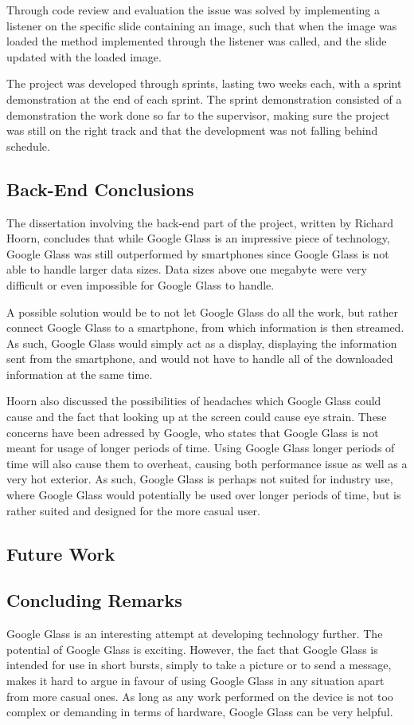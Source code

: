 Through code review and evaluation the issue was solved by implementing a listener on the specific slide containing an image, such that when the image was loaded the method implemented through the listener was called, and the slide updated with the loaded image.

The project was developed through sprints, lasting two weeks each, with a sprint demonstration at the end of each sprint. The sprint demonstration consisted of a demonstration the work done so far to the supervisor, making sure the project was still on the right track and that the development was not falling behind schedule.

\subsection{Back-End Conclusions}
The dissertation involving the back-end part of the project, written by Richard Hoorn, concludes that while Google Glass is an impressive piece of technology, Google Glass was still outperformed by smartphones since Google Glass is not able to handle larger data sizes. Data sizes above one megabyte were very difficult or even impossible for Google Glass to handle.

A possible solution would be to not let Google Glass do all the work, but rather connect Google Glass to a smartphone, from which information is then streamed. As such, Google Glass would simply act as a display, displaying the information sent from the smartphone, and would not have to handle all of the downloaded information at the same time.

Hoorn also discussed the possibilities of headaches which Google Glass could cause and the fact that looking up at the screen could cause eye strain. These concerns have been adressed by Google, who states that Google Glass is not meant for usage of longer periods of time. Using Google Glass longer periods of time will also cause them to overheat, causing both performance issue as well as a very hot exterior. As such, Google Glass is perhaps not suited for industry use, where Google Glass would potentially be used over longer periods of time, but is rather suited and designed for the more casual user.

\subsection{Future Work}
\label{subsec:futurework}


\subsection{Concluding Remarks}
Google Glass is an interesting attempt at developing technology further. The potential of Google Glass is exciting. However, the fact that Google Glass is intended for use in short bursts, simply to take a picture or to send a message, makes it hard to argue in favour of using Google Glass in any situation apart from more casual ones. As long as any work performed on the device is not too complex or demanding in terms of hardware, Google Glass can be very helpful.

